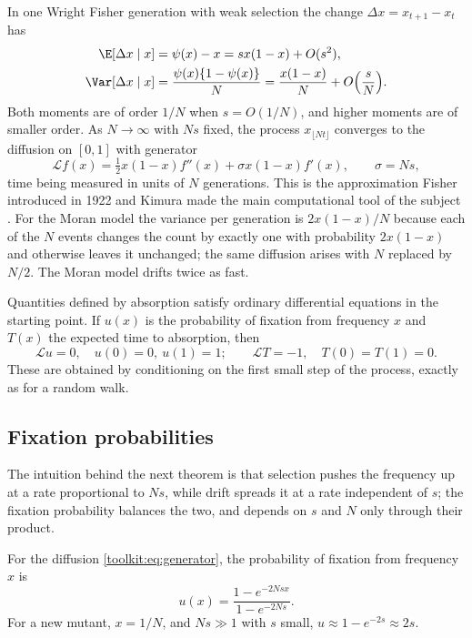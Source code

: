 In one Wright Fisher generation with weak selection the change $\Delta x=x_{t+1}-x_t$ has
\begin{align*}
\E[\Delta x\mid x]&=\psi(x)-x=sx(1-x)+O(s^2),\\
\Var[\Delta x\mid x]&=\frac{\psi(x)\{1-\psi(x)\}}{N}=\frac{x(1-x)}{N}+O\Big(\frac sN\Big).
\end{align*}
Both moments are of order $1/N$ when $s=O(1/N)$, and higher moments are of smaller order. As
$N\to\infty$ with $Ns$ fixed, the process $x_{\lfloor Nt\rfloor}$ converges to the diffusion on
$[0,1]$ with generator
\begin{equation}\label{toolkit:eq:generator}
\mathcal{L}f(x)=\tfrac12x(1-x)f''(x)+\sigma x(1-x)f'(x),\qquad \sigma=Ns,
\end{equation}
time being measured in units of $N$ generations. This is the approximation Fisher introduced in
1922 and Kimura made the main computational tool of the subject \citep{toolkit:kimura1962}. For
the Moran model the variance per generation is $2x(1-x)/N$ because each of the $N$ events changes
the count by exactly one with probability $2x(1-x)$ and otherwise leaves it unchanged; the same diffusion arises with $N$
replaced by $N/2$. The Moran model drifts twice as fast.

Quantities defined by absorption satisfy ordinary differential equations in the starting point.
If $u(x)$ is the probability of fixation from frequency $x$ and $T(x)$ the expected time to
absorption, then
\begin{equation}\label{toolkit:eq:backward}
\mathcal{L}u=0,\quad u(0)=0,\ u(1)=1;\qquad \mathcal{L}T=-1,\quad T(0)=T(1)=0 .
\end{equation}
These are obtained by conditioning on the first small step of the process, exactly as for a
random walk.

\subsection{Fixation probabilities}\label{toolkit:sec:fixation}

The intuition behind the next theorem is that selection pushes the frequency up at a rate
proportional to $Ns$, while drift spreads it at a rate independent of $s$; the fixation
probability balances the two, and depends on $s$ and $N$ only through their product.

\begin{theorem}\label{toolkit:thm:kimura}
For the diffusion \eqref{toolkit:eq:generator}, the probability of fixation from frequency $x$ is
\begin{equation}\label{toolkit:eq:kimura}
u(x)=\frac{1-e^{-2Nsx}}{1-e^{-2Ns}} .
\end{equation}
For a new mutant, $x=1/N$, and $Ns\gg1$ with $s$ small, $u\approx1-e^{-2s}\approx2s$.
\end{theorem}


